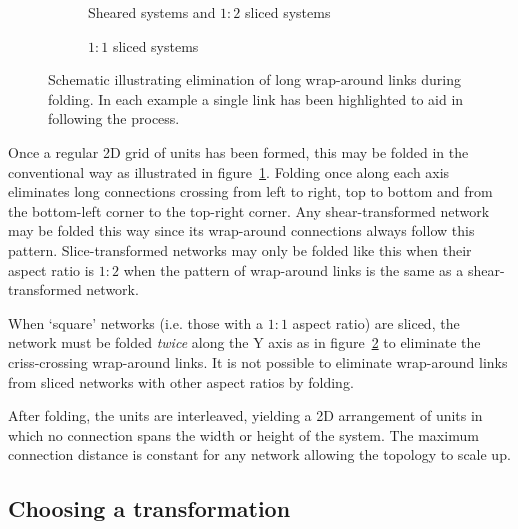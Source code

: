 			\begin{figure}
				\begin{subfigure}{\linewidth}
					\center
					\caption{Sheared systems and $1:2$ sliced systems}
					\label{fig:folding-sheared}
				\end{subfigure}
				
				\vspace{1em}
				
				\begin{subfigure}{\linewidth}
					\center
					\caption{$1:1$ sliced systems}
					\label{fig:folding-sliced}
				\end{subfigure}
				
				\caption[Elimination of long wrap-around links by folding.]%
				{Schematic illustrating elimination of long wrap-around links
				during folding. In each example a single link has been highlighted to
				aid in following the process.}
				\label{fig:folding}
			\end{figure}
			
			Once a regular 2D grid of units has been formed, this may be folded in
			the conventional way as illustrated in figure~\ref{fig:folding-sheared}.
			Folding once along each axis eliminates long connections crossing from
			left to right, top to bottom and from the bottom-left corner to the
			top-right corner. Any shear-transformed network may be folded this way
			since its wrap-around connections always follow this pattern.
			Slice-transformed networks may only be folded like this when their aspect
			ratio is $1:2$ when the pattern of wrap-around links is the same as a
			shear-transformed network.
			
			When `square' networks (i.e. those with a $1:1$ aspect ratio) are sliced,
			the network must be folded \emph{twice} along the Y axis as in
			figure~\ref{fig:folding-sliced} to eliminate the criss-crossing
			wrap-around links. It is not possible to eliminate wrap-around links from
			sliced networks with other aspect ratios by folding.
			
			After folding, the units are interleaved, yielding a 2D arrangement of
			units in which no connection spans the width or height of the system. The
			maximum connection distance is constant for any network allowing the
			topology to scale up.
		
		\subsection{Choosing a transformation}
			
